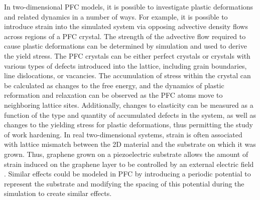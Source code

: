 In two-dimensional PFC models, it is possible to investigate plastic deformations and related dynamics in a number of ways.  For example, it is possible to introduce strain into the simulated system via opposing advective density flows across regions of a PFC crystal.  The strength of the advective flow required to cause plastic deformations can be determined by simulation and used to derive the yield stress.  The PFC crystals can be either perfect crystals or crystals with various types of defects introduced into the lattice, including grain boundaries, line dislocations, or vacancies.  The accumulation of stress within the crystal can be calculated as changes to the free energy, and the dynamics of plastic reformation and relaxation can be observed as the PFC atoms move to neighboring lattice sites.  Additionally, changes to elasticity can be measured as a function of the type and quantity of accumulated defects in the system, as well as changes to the yielding stress for plastic deformations, thus permitting the study of work hardening.  In real two-dimensional systems, strain is often associated with lattice mismatch between the 2D material and the substrate on which it was grown.  Thus, graphene grown on a piezoelectric substrate allows the amount of strain induced on the graphene layer to be controlled by an external electric field \cite{gonzález2017manybody-4d0}.  Similar effects could be modeled in PFC by introducing a periodic potential to represent the substrate and modifying the spacing of this potential during the simulation to create similar effects. 

